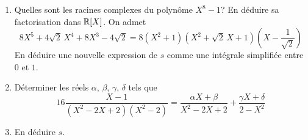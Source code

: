 \begin{enumerate}
 \item Quelles sont les racines complexes du polynôme $X^8 - 1$?\newline
 En déduire sa factorisation dans $\mathbb{R}[X]$. On admet
\begin{displaymath}
8X^5 + 4 \sqrt{2}\,X^4 + 8X^3 - 4\sqrt{2} = 8(X^2+1)(X^2 + \sqrt{2}\,X +1)(X - \frac{1}{\sqrt{2}}) 
\end{displaymath}
En déduire une nouvelle expression de $s$ comme une intégrale simplifiée entre $0$ et $1$.

 \item Déterminer les réels $\alpha$, $\beta$, $\gamma$, $\delta$ tels que 
\begin{displaymath}
 16\frac{X - 1}{(X^2 - 2X + 2)(X^2 - 2)} = 
 \frac{\alpha X + \beta}{X^2 - 2X + 2} 
 + \frac{\gamma X +\delta }{2-X^2} 
\end{displaymath}


\item En déduire $s$.
\end{enumerate}

